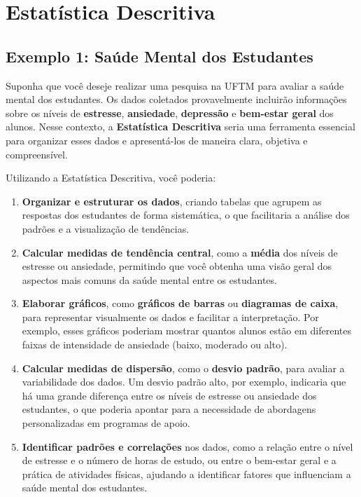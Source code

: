 \documentclass[
]{book}
\providecommand{\tightlist}{%
  \setlength{\itemsep}{0pt}\setlength{\parskip}{0pt}}
\begin{document}
\section{Estatística Descritiva}\label{estatuxedstica-descritiva}

\subsection{\texorpdfstring{Exemplo 1: \textbf{Saúde Mental dos Estudantes}}{Exemplo 1: Saúde Mental dos Estudantes}}\label{exemplo-1-sauxfade-mental-dos-estudantes}

Suponha que você deseje realizar uma pesquisa na UFTM para avaliar a saúde mental dos estudantes. Os dados coletados provavelmente incluirão informações sobre os níveis de \textbf{estresse}, \textbf{ansiedade}, \textbf{depressão} e \textbf{bem-estar geral} dos alunos. Nesse contexto, a \textbf{Estatística Descritiva} seria uma ferramenta essencial para organizar esses dados e apresentá-los de maneira clara, objetiva e compreensível.

Utilizando a Estatística Descritiva, você poderia:

\begin{enumerate}
\def\labelenumi{\arabic{enumi}.}
\tightlist
\item
  \textbf{Organizar e estruturar os dados}, criando tabelas que agrupem as respostas dos estudantes de forma sistemática, o que facilitaria a análise dos padrões e a visualização de tendências.
\item
  \textbf{Calcular medidas de tendência central}, como a \textbf{média} dos níveis de estresse ou ansiedade, permitindo que você obtenha uma visão geral dos aspectos mais comuns da saúde mental entre os estudantes.
\item
  \textbf{Elaborar gráficos}, como \textbf{gráficos de barras} ou \textbf{diagramas de caixa}, para representar visualmente os dados e facilitar a interpretação. Por exemplo, esses gráficos poderiam mostrar quantos alunos estão em diferentes faixas de intensidade de ansiedade (baixo, moderado ou alto).
\item
  \textbf{Calcular medidas de dispersão}, como o \textbf{desvio padrão}, para avaliar a variabilidade dos dados. Um desvio padrão alto, por exemplo, indicaria que há uma grande diferença entre os níveis de estresse ou ansiedade dos estudantes, o que poderia apontar para a necessidade de abordagens personalizadas em programas de apoio.
\item
  \textbf{Identificar padrões e correlações} nos dados, como a relação entre o nível de estresse e o número de horas de estudo, ou entre o bem-estar geral e a prática de atividades físicas, ajudando a identificar fatores que influenciam a saúde mental dos estudantes.
\end{enumerate}
\end{document}
